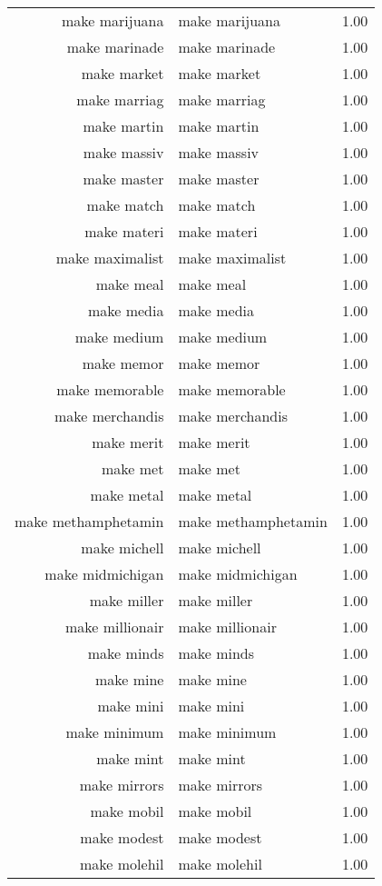 \begin{table}[ht]
\begin{tabular}{rlr}
  make marijuana & make marijuana & 1.00 \\ 
  make marinade & make marinade & 1.00 \\ 
  make market & make market & 1.00 \\ 
  make marriag & make marriag & 1.00 \\ 
  make martin & make martin & 1.00 \\ 
  make massiv & make massiv & 1.00 \\ 
  make master & make master & 1.00 \\ 
  make match & make match & 1.00 \\ 
  make materi & make materi & 1.00 \\ 
  make maximalist & make maximalist & 1.00 \\ 
  make meal & make meal & 1.00 \\ 
  make media & make media & 1.00 \\ 
  make medium & make medium & 1.00 \\ 
  make memor & make memor & 1.00 \\ 
  make memorable & make memorable & 1.00 \\ 
  make merchandis & make merchandis & 1.00 \\ 
  make merit & make merit & 1.00 \\ 
  make met & make met & 1.00 \\ 
  make metal & make metal & 1.00 \\ 
  make methamphetamin & make methamphetamin & 1.00 \\ 
  make michell & make michell & 1.00 \\ 
  make midmichigan & make midmichigan & 1.00 \\ 
  make miller & make miller & 1.00 \\ 
  make millionair & make millionair & 1.00 \\ 
  make minds & make minds & 1.00 \\ 
  make mine & make mine & 1.00 \\ 
  make mini & make mini & 1.00 \\ 
  make minimum & make minimum & 1.00 \\ 
  make mint & make mint & 1.00 \\ 
  make mirrors & make mirrors & 1.00 \\ 
  make mobil & make mobil & 1.00 \\ 
  make modest & make modest & 1.00 \\ 
  make molehil & make molehil & 1.00 \\ 

\end{tabular}
\end{table}
